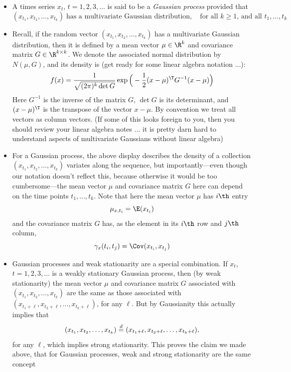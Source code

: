 \documentclass{article}
\begin{document}
\begin{itemize}
\item A times series $x_t$, $t = 1,2,3,\dots$ is said to be a \emph{Gaussian
    process} provided that  
  \[
  (x_{t_1}, x_{t_2}, \dots, x_{t_k}) \; \text{has a multivariate Gaussian
    distribution}, \quad \text{for all $k \geq 1$, and all $t_1,\dots,t_k$} 
  \]

\item Recall, if the random vector $(x_{t_1}, x_{t_2}, \dots, x_{t_k})$ has a 
  multivariate Gaussian distribution, then it is defined by a mean vector $\mu
  \in \R^k$ and covariance matrix $G \in \R^{k \times k}$. We denote the
  associated normal distribution by $N(\mu, G)$, and its density is (get ready
  for some linear algebra notation ...): 
  \[
  f(x) = \frac{1}{\sqrt{(2\pi)^k \det G}} \exp \Big( - \frac{1}{2} (x - \mu)^\T
    G^{-1} ( x - \mu ) \Big)  
  \]
  Here $G^{-1}$ is the inverse of the matrix $G$, $\det G$ is its determinant,
  and $(x-\mu)^\T$ is the transpose of the vector $x-\mu$. By convention we
  treat all vectors as column vectors. (If some of this looks foreign to you,
  then you should review your linear algebra notes ... it is pretty darn hard to
  understand aspects of multivariate Gaussians without linear algebra) 

\item For a Gaussian process, the above display describes the density of a
  collection $(x_{t_1}, x_{t_2}, \dots, x_{t_k})$ variates along the sequence,
  but importantly---even though our notation doesn't reflect this, because
  otherwise it would be too cumbersome---the mean vector $\mu$ and covariance
  matrix $G$ here can depend on the time points $t_1,\dots,t_k$. Note that here
  the mean vector $\mu$ has $i\th$ entry 
  \[
  \mu_{x,t_i} = \E(x_{t_i})
  \]
  and the covariance matrix $G$ has, as the element in its $i\th$ row and $j\th$
  column,  
  \[
  \gamma_x(t_i, t_j) = \Cov(x_{t_i}, x_{t_j})
  \]

\item Gaussian processes and weak stationarity are a special combination. If
  $x_t$, $t = 1,2,3,\dots$ is a weakly stationary Gaussian process, then (by
  weak stationarity) the mean vector $\mu$ and covariance matrix $G$ associated
  with $(x_{t_1}, x_{t_2}, \dots, x_{t_k})$ are the same as those associated
  with $(x_{t_1+\ell}, x_{t_2+\ell}, \dots, x_{t_k+\ell})$, for any $\ell$. But
  by Gaussianity this actually implies that  
  \[
  (x_{t_1}, x_{t_2}, \dots, x_{t_k}) \overset{d}{=} (x_{t_1+\ell}, x_{t_2+\ell}, \dots,
  x_{t_k+\ell}),
  \]
  for any $\ell$, which implies strong stationarity. This proves the claim we
  made above, that for Gaussian processes, weak and strong stationarity are the
  same concept 
\end{itemize}
\end{document}
